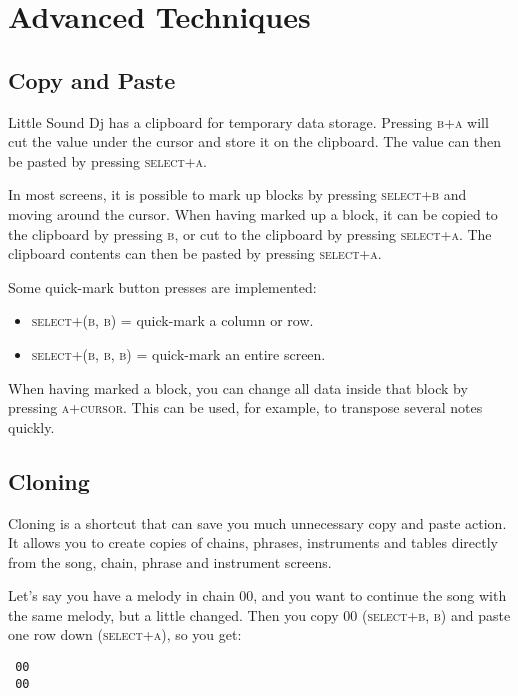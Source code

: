 \chapter{Advanced Techniques}

\section{Copy and Paste} \label{copy-paste}

Little Sound Dj has a clipboard for temporary data storage. Pressing \textsc{b+a} will cut the value
under the cursor and store it on the clipboard. The value can then be pasted by pressing
\textsc{select+a}.

In most screens, it is possible to mark up blocks by pressing \textsc{select+b} and moving around
the cursor. When having marked up a block, it can be copied to the clipboard by pressing \textsc{b},
or cut to the clipboard by pressing \textsc{select+a}. The clipboard contents can then be pasted by
pressing \textsc{select+a}.

Some quick-mark button presses are implemented:
\begin{itemize}
\item \textsc{select+(b, b)} = quick-mark a column or row.
\item \textsc{select+(b, b, b)} = quick-mark an entire screen.
\end{itemize}

When having marked a block, you can change all data inside that block by pressing \textsc{a+cursor}. This can be used, for example, to transpose several notes quickly.

\section{Cloning} \label{cloning}

Cloning is a shortcut that can save you much unnecessary copy and paste action. It allows you to create copies of chains, phrases, instruments and tables directly from the song, chain, phrase and instrument screens.

Let's say you have a melody in chain 00, and you want to continue the song with the same melody, but a little changed. Then you copy 00 \textsc{(select+b, b)} and paste one row down \textsc{(select+a)}, so you get:

\begin{verbatim}
 00
 00
\end{verbatim}

